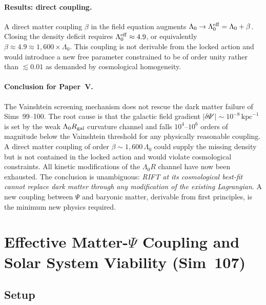 \documentclass[12pt,a4paper]{article}
\begin{document}
\paragraph{Results: direct coupling.}
A direct matter coupling $\beta$ in the field equation augments
$\Lambda_0 \to \Lambda_0^{\rm eff} = \Lambda_0 + \beta$.  Closing the density
deficit requires $\Lambda_0^{\rm eff} \approx 4.9$, or equivalently
$\beta \approx 4.9 \approx 1{,}600 \times \Lambda_0$.  This coupling is not
derivable from the locked action and would introduce a new free parameter
constrained to be of order unity rather than $\lesssim 0.01$ as demanded by
cosmological homogeneity.

\paragraph{Conclusion for Paper~V.}
The Vainshtein screening mechanism does not rescue the dark matter failure of
Sims~99--100.  The root cause is that the galactic field gradient
$|\delta\Psi'| \sim 10^{-8}\,\mathrm{kpc}^{-1}$ is set by the weak
$\Lambda_0 R_{\rm gal}$ curvature channel and falls $10^{4}$--$10^{6}$ orders of
magnitude below the Vainshtein threshold for any physically reasonable coupling.
A direct matter coupling of order $\beta \sim 1{,}600\,\Lambda_0$ could supply the
missing density but is not contained in the locked action and would violate
cosmological constraints.  All kinetic modifications of the $\Lambda_0 R$ channel
have now been exhausted.  The conclusion is unambiguous: \emph{RIFT at its
cosmological best-fit cannot replace dark matter through any modification of the
existing Lagrangian}.  A new coupling between $\Psi$ and baryonic matter,
derivable from first principles, is the minimum new physics required.

\section{Effective Matter-$\Psi$ Coupling and Solar System Viability (Sim~107)}
\label{sec:sim107}

\subsection{Setup}
\end{document}
